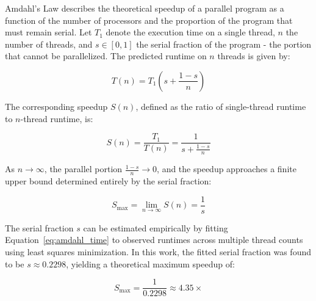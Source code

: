 \documentclass[journal]{IEEEtran}
\begin{document}
\par Amdahl's Law describes the theoretical speedup of a parallel program as a function of the number of processors and the proportion of the program that must remain serial. Let $T_1$ denote the execution time on a single thread, $n$ the number of threads, and $s \in [0, 1]$ the serial fraction of the program - the portion that cannot be parallelized. The predicted runtime on $n$ threads is given by: 

\begin{equation}
    T(n) = T_1 \left( s + \frac{1 - s}{n} \right)
    \label{eq:amdahl_time}
\end{equation}

The corresponding speedup $S(n)$, defined as the ratio of single-thread runtime to $n$-thread runtime, is:
 
\begin{equation}
    S(n) = \frac{T_1}{T(n)} = \frac{1}{s + \frac{1-s}{n}}
    \label{eq:amdahl_speedup}
\end{equation}
 
As $n \to \infty$, the parallel portion $\frac{1-s}{n} \to 0$, and the speedup approaches a finite upper bound determined entirely by the serial fraction:
 
\begin{equation}
    S_{\max} = \lim_{n \to \infty} S(n) = \frac{1}{s}
    \label{eq:amdahl_max}
\end{equation}
 
The serial fraction $s$ can be estimated empirically by fitting Equation~\ref{eq:amdahl_time} to observed runtimes across multiple thread counts using least squares minimization. In this work, the fitted serial fraction was found to be $s \approx 0.2298$, yielding a theoretical maximum speedup of:

\begin{equation}
    S_{\max} = \frac{1}{0.2298} \approx 4.35\times
    \label{eq:amdahl_max_observed}
\end{equation}
\end{document}
